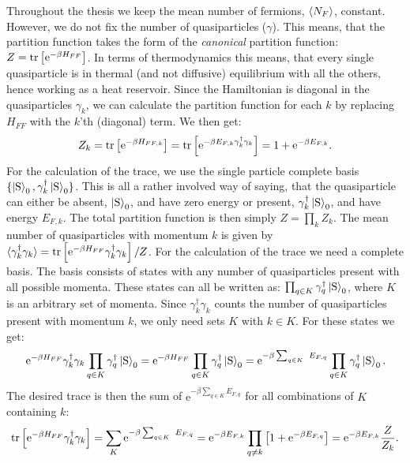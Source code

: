 Throughout the thesis we keep the mean number of fermions, $\braket{N_F}$, constant. However, we do not fix the number of quasiparticles ($\gamma$). This means, that the partition function takes the form of the \textit{canonical} partition function: $Z = \operatorname{tr}\left[\text{e}^{-\beta H_{FF}}\right]$. In terms of thermodynamics this means, that every single quasiparticle is in thermal (and not diffusive) equilibrium with all the others, hence working as a heat reservoir. Since the Hamiltonian is diagonal in the quasiparticles $\gamma_k$, we can calculate the partition function for each $k$ by replacing $H_{FF}$ with the $k$'th (diagonal) term. We then get:
\begin{equation}
Z_k = \operatorname{tr}\left[\text{e}^{-\beta H_{FF,k}}\right] = \operatorname{tr}\left[\text{e}^{-\beta E_{F,k}\gamma^\dagger_k\gamma_k }\right] = 1 + \text{e}^{-\beta E_{F,k}}. \nonumber
\end{equation}     
For the calculation of the trace, we use the single particle complete basis $\{\ket{\text{S}}_0, \gamma^\dagger_k\ket{\text{S}}_0\}$. This is all a rather involved way of saying, that the quasiparticle can either be absent, $\ket{\text{S}}_0$, and have zero energy or present, $\gamma^\dagger_k\ket{\text{S}}_0$, and have energy $E_{F,k}$. The total partition function is then simply $Z = \prod_k Z_k$. The mean number of quasiparticles with momentum $k$ is given by $\braket{\gamma^\dagger_k\gamma_k} = \operatorname{tr}\left[\text{e}^{-\beta H_{FF}}\gamma^\dagger_k\gamma_k\right]/Z$. For the calculation of the trace we need a complete basis. The basis consists of states with any number of quasiparticles present with all possible momenta. These states can all be written as: $\prod_{q\in K} \gamma^\dagger_q \ket{\text{S}}_0$, where $K$ is an arbitrary set of momenta. Since $\gamma^\dagger_k\gamma_k$ counts the number of quasiparticles present with momentum $k$, we only need sets $K$ with $k \in K$. For these states we get:
\begin{equation}
\text{e}^{-\beta H_{FF}} \gamma^\dagger_k \gamma_k\prod_{q\in K} \gamma^\dagger_q \ket{\text{S}}_0 = \text{e}^{-\beta H_{FF}}\prod_{q\in K} \gamma^\dagger_q \ket{\text{S}}_0  = \text{e}^{-\beta \sum_{q \in K} E_{F,q}} \prod_{q\in K} \gamma^\dagger_q \ket{\text{S}}_0. \nonumber
\end{equation}
The desired trace is then the sum of $\text{e}^{-\beta \sum_{q \in K} E_{F,q}}$ for all combinations of $K$ containing $k$:
\begin{equation}
\tr\left[\text{e}^{-\beta H_{FF}}\gamma^\dagger_k\gamma_k\right] = \sum_K \text{e}^{-\beta \sum_{q \in K} E_{F,q}} = \text{e}^{-\beta E_{F,k}}\prod_{q \neq k} \left[1 + \text{e}^{-\beta E_{F,q}}\right] = \text{e}^{-\beta E_{F,k}} \frac{Z}{Z_k}. \nonumber 
\end{equation}
